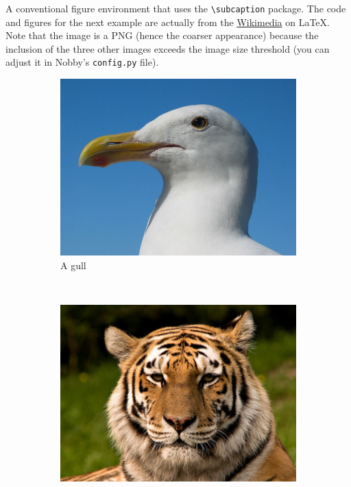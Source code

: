\documentclass[10pt]{article}
\begin{document}
A conventional figure environment that uses the
\texttt{\textbackslash{subcaption}} package. The code and figures for
the next example are actually from the
\href{http://en.wikibooks.org/wiki/LaTeX/Floats,_Figures_and_Captions}{Wikimedia}
on \LaTeX. Note that the image is a PNG (hence the coarser appearance)
because the inclusion of the three other images exceeds the image size
threshold (you can adjust it in Nobby's \texttt{config.py} file).\\


\begin{figure}
  \centering
  \begin{subfigure}[b]{0.3\textwidth}
    \includegraphics[width=\textwidth]{gull}
    \caption{A gull}
    \label{fig:gull}
  \end{subfigure}%
  ~ %
  \begin{subfigure}[b]{0.3\textwidth}
    \includegraphics[width=\textwidth]{tiger}

\end{subfigure}
\end{figure}
\end{document}
